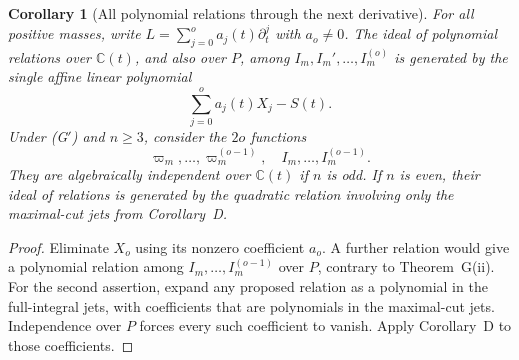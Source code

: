 \documentclass[11pt,a4paper]{article}
\newtheorem{corollary}[theorem]{Corollary}
\theoremstyle{definition}
\theoremstyle{remark}
\numberwithin{equation}{section}
\newcommand{\C}{\mathbb{C}}
\begin{document}
\begin{corollary}[All polynomial relations through the next derivative]\label{bs:cor:fullrelations}
For all positive masses, write $L=\sum_{j=0}^o a_j(t)\partial_t^j$ with $a_o\ne0$. The ideal of polynomial relations over $\C(t)$, and also over $P$, among $I_m,I_m',\ldots,I_m^{(o)}$ is generated by the single affine linear polynomial
\[
\sum_{j=0}^o a_j(t)X_j-S(t).
\]
Under {\rm(G$'$)} and $n\ge3$, consider the $2o$ functions
\[
\varpi_m,\ldots,\varpi_m^{(o-1)},\quad I_m,\ldots,I_m^{(o-1)}.
\]
They are algebraically independent over $\C(t)$ if $n$ is odd. If $n$ is even, their ideal of relations is generated by the quadratic relation involving only the maximal-cut jets from Corollary~D.
\end{corollary}

\begin{proof}
Eliminate $X_o$ using its nonzero coefficient $a_o$. A further relation would give a polynomial relation among $I_m,\ldots,I_m^{(o-1)}$ over $P$, contrary to Theorem~G(ii). For the second assertion, expand any proposed relation as a polynomial in the full-integral jets, with coefficients that are polynomials in the maximal-cut jets. Independence over $P$ forces every such coefficient to vanish. Apply Corollary~D to those coefficients.
\end{proof}
\end{document}
